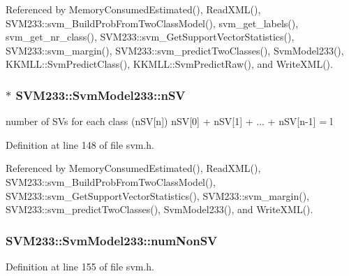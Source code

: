 Referenced by Memory\+Consumed\+Estimated(), Read\+X\+M\+L(), S\+V\+M233\+::svm\+\_\+\+Build\+Prob\+From\+Two\+Class\+Model(), svm\+\_\+get\+\_\+labels(), svm\+\_\+get\+\_\+nr\+\_\+class(), S\+V\+M233\+::svm\+\_\+\+Get\+Support\+Vector\+Statistics(), S\+V\+M233\+::svm\+\_\+margin(), S\+V\+M233\+::svm\+\_\+predict\+Two\+Classes(), Svm\+Model233(), K\+K\+M\+L\+L\+::\+Svm\+Predict\+Class(), K\+K\+M\+L\+L\+::\+Svm\+Predict\+Raw(), and Write\+X\+M\+L().

\subsubsection[{\texorpdfstring{n\+SV}{nSV}}]{$\ast$ S\+V\+M233\+::\+Svm\+Model233\+::n\+SV}\hypertarget{struct_s_v_m233_1_1_svm_model233_a4f2e1cae54d713246c1c7b63a5b30136}{}\label{struct_s_v_m233_1_1_svm_model233_a4f2e1cae54d713246c1c7b63a5b30136}
number of S\+Vs for each class (n\+SV\mbox{[}n\mbox{]}) n\+SV\mbox{[}0\mbox{]} + n\+SV\mbox{[}1\mbox{]} + ... + n\+SV\mbox{[}n-\/1\mbox{]} = l 

Definition at line 148 of file svm.\+h.



Referenced by Memory\+Consumed\+Estimated(), Read\+X\+M\+L(), S\+V\+M233\+::svm\+\_\+\+Build\+Prob\+From\+Two\+Class\+Model(), S\+V\+M233\+::svm\+\_\+\+Get\+Support\+Vector\+Statistics(), S\+V\+M233\+::svm\+\_\+margin(), S\+V\+M233\+::svm\+\_\+predict\+Two\+Classes(), Svm\+Model233(), and Write\+X\+M\+L().

\subsubsection[{\texorpdfstring{num\+Non\+SV}{numNonSV}}]{ S\+V\+M233\+::\+Svm\+Model233\+::num\+Non\+SV}\hypertarget{struct_s_v_m233_1_1_svm_model233_ac47eca978ebd760afbb5a2e72bfff274}{}\label{struct_s_v_m233_1_1_svm_model233_ac47eca978ebd760afbb5a2e72bfff274}


Definition at line 155 of file svm.\+h.



